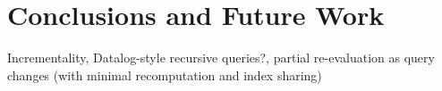\documentclass[runningheads]{llncs}
\begin{document}
\section{Conclusions and Future Work}\label{sec:conclusions}
Incrementality, Datalog-style recursive queries?, partial re-evaluation as
query changes (with minimal recomputation and index sharing)
%
%



\end{document}
